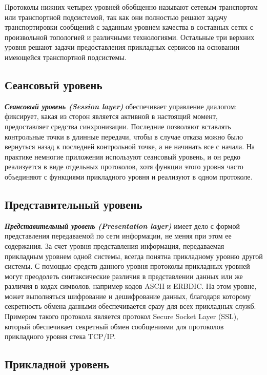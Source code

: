 Протоколы нижних четырех уровней обобщенно называют сетевым транспортом или транспортной подсистемой, так как они полностью решают задачу транспортировки сообщений с заданным уровнем качества в составных сетях с произвольной топологией и различными технологиями.
Остальные три верхних уровня решают задачи предоставления прикладных сервисов на основании имеющейся транспортной подсистемы.

\subsection{Сеансовый уровень}

\textbf{\textit{Сеансовый уровень (Session layer)}} обеспечивает управление диалогом: фиксирует, какая из сторон является активной в настоящий момент, предоставляет средства синхронизации.
Последние позволяют вставлять контрольные точки в длинные передачи, чтобы в случае отказа можно было вернуться назад к последней контрольной точке, а не начинать все с начала.
На практике немногие приложения используют сеансовый уровень, и он редко реализуется в виде отдельных протоколов, хотя функции этого уровня часто объединяют с функциями прикладного уровня и реализуют в одном протоколе.

\subsection{Представительный уровень}

\textbf{\textit{Представительный уровень (Presentation layer)}} имеет дело с формой представления передаваемой по сети информации, не меняя при этом ее содержания.
За счет уровня представления информация, передаваемая прикладным уровнем одной системы, всегда понятна прикладному уровню другой системы.
С помощью средств данного уровня протоколы прикладных уровней могут преодолеть синтаксические различия в представлении данных или же различия в кодах символов, например кодов ASCII и ERBDIC.
На этом уровне, может выполняться шифрование и дешифрование данных, благодаря которому секретность обмена данными обеспечивается сразу для всех прикладных служб.
Примером такого протокола является протокол Secure Socket Layer (SSL), который обеспечивает секретный обмен сообщениями для протоколов прикладного уровня стека TCP/IP.

\subsection{Прикладной уровень}

